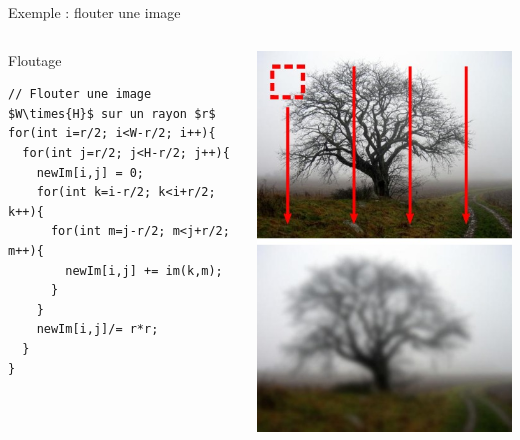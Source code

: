 \begin{frame}[fragile]{Exemple : flouter une image}
\begin{columns}
\begin{column}{0.65\linewidth}
\begin{exampleblock}{Floutage}
\begin{verbatim}
// Flouter une image $W\times{H}$ sur un rayon $r$
for(int i=r/2; i<W-r/2; i++){
  for(int j=r/2; j<H-r/2; j++){
    newIm[i,j] = 0;
    for(int k=i-r/2; k<i+r/2; k++){
      for(int m=j-r/2; m<j+r/2; m++){
        newIm[i,j] += im(k,m);
      }
    }
    newIm[i,j]/= r*r;
  }
}
\end{verbatim}
\end{exampleblock}
\end{column}
\begin{column}{0.35\linewidth}
\includegraphics[width=\textwidth]{images/blur.jpg}
\end{column}
\end{columns}
\end{frame}


